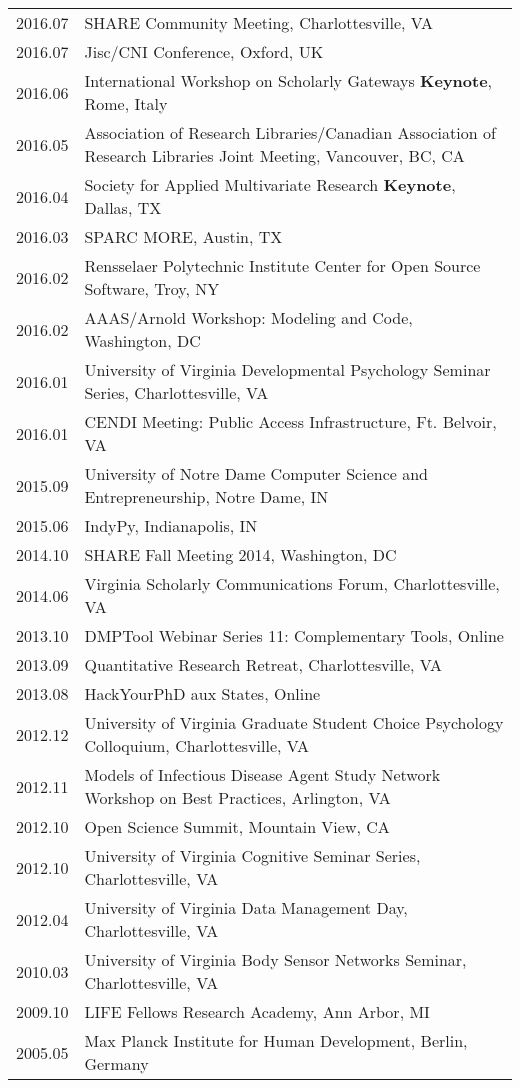 \documentclass[11pt]{article}
\begin{document}
\begin{tabularx}{\textwidth}{lX}
    2016.07     & SHARE Community Meeting, Charlottesville, VA\\
    2016.07     & Jisc/CNI Conference, Oxford, UK\\
    2016.06     & International Workshop on Scholarly Gateways \textbf{Keynote}, Rome, Italy\\
    2016.05     & Association of Research Libraries/Canadian Association of Research Libraries Joint Meeting, Vancouver, BC, CA\\
    2016.04     & Society for Applied Multivariate Research \textbf{Keynote}, Dallas, TX\\
    2016.03     & SPARC MORE, Austin, TX\\
    2016.02     & Rensselaer Polytechnic Institute Center for Open Source Software, Troy, NY\\
    2016.02     & AAAS/Arnold Workshop: Modeling and Code, Washington, DC\\
    2016.01     & University of Virginia Developmental Psychology Seminar Series, Charlottesville, VA\\
    2016.01     & CENDI Meeting: Public Access Infrastructure, Ft. Belvoir, VA\\
    2015.09     & University of Notre Dame Computer Science and Entrepreneurship, Notre Dame, IN\\
    2015.06     & IndyPy, Indianapolis, IN\\
    2014.10     & SHARE Fall Meeting 2014, Washington, DC\\
    2014.06     & Virginia Scholarly Communications Forum, Charlottesville, VA\\
    2013.10     & DMPTool Webinar Series 11: Complementary Tools, Online\\
    2013.09     & Quantitative Research Retreat, Charlottesville, VA\\
    2013.08     & HackYourPhD aux States, Online\\
    2012.12     & University of Virginia Graduate Student Choice Psychology Colloquium, Charlottesville, VA\\
    2012.11     & Models of Infectious Disease Agent Study Network Workshop on Best Practices, Arlington, VA\\
    2012.10     & Open Science Summit, Mountain View, CA\\
    2012.10     & University of Virginia Cognitive Seminar Series, Charlottesville, VA\\
    2012.04     & University of Virginia Data Management Day, Charlottesville, VA\\
    2010.03     & University of Virginia Body Sensor Networks Seminar, Charlottesville, VA\\
    2009.10     & LIFE Fellows Research Academy, Ann Arbor, MI\\
    2005.05     & Max Planck Institute for Human Development, Berlin, Germany\\
\end{tabularx}
\end{document}
